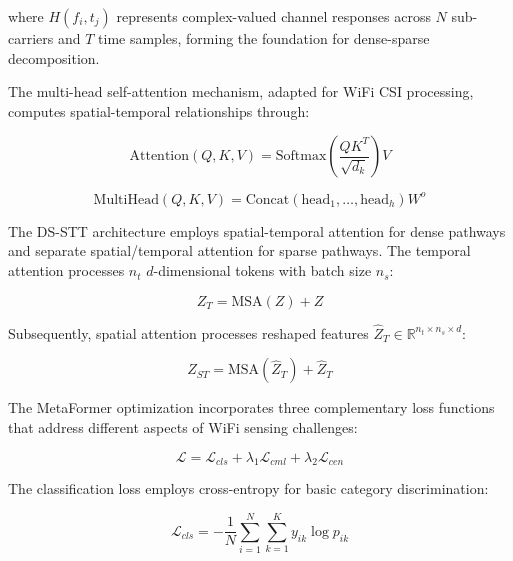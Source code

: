 \documentclass[journal]{IEEEtran}
\begin{document}
where $H(f_i,t_j)$ represents complex-valued channel responses across $N$ sub-carriers and $T$ time samples, forming the foundation for dense-sparse decomposition.

The multi-head self-attention mechanism, adapted for WiFi CSI processing, computes spatial-temporal relationships through:

\begin{equation}
\text{Attention}(Q,K,V) = \text{Softmax}\left(\frac{QK^T}{\sqrt{d_k}}
\right)V
\label{eq:metaformer_attention}
\end{equation}

\begin{equation}
\text{MultiHead}(Q,K,V) = \text{Concat}(\text{head}_1, \ldots, \text{head}_h)W^o
\label{eq:metaformer_multihead}
\end{equation}

The DS-STT architecture employs spatial-temporal attention for dense pathways and separate spatial/temporal attention for sparse pathways. The temporal attention processes $n_t$ $d$-dimensional tokens with batch size $n_s$:

\begin{equation}
Z_T = \text{MSA}(Z) + Z
\label{eq:metaformer_temporal}
\end{equation}

Subsequently, spatial attention processes reshaped features $\hat{Z}_T \in \mathbb{R}^{n_t \times n_s \times d}$:

\begin{equation}
Z_{ST} = \text{MSA}(\hat{Z}_T) + \hat{Z}_T
\label{eq:metaformer_spatial}
\end{equation}

The MetaFormer optimization incorporates three complementary loss functions that address different aspects of WiFi sensing challenges:

\begin{equation}
\mathcal{L} = \mathcal{L}_{cls} + \lambda_1 \mathcal{L}_{cml} + \lambda_2 \mathcal{L}_{cen}
\label{eq:metaformer_total_loss}
\end{equation}

The classification loss employs cross-entropy for basic category discrimination:

\begin{equation}
\mathcal{L}_{cls} = -\frac{1}{N} \sum_{i=1}^{N} \sum_{k=1}^{K} y_{ik} \log p_{ik}
\label{eq:metaformer_classification_loss}
\end{equation}
\end{document}
